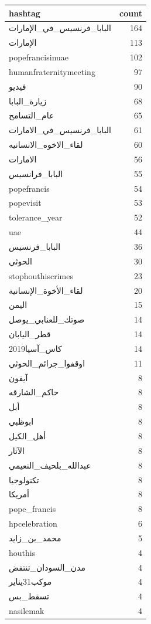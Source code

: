 \begin{tabular}{lr}
\toprule
hashtag & count \\
\midrule
البابا\_فرنسيس\_في\_الإمارات & 164 \\
الإمارات & 113 \\
popefrancisinuae & 102 \\
humanfraternitymeeting & 97 \\
فيديو & 90 \\
زيارة\_البابا & 68 \\
عام\_التسامح & 65 \\
البابا\_فرنسيس\_في\_الامارات & 61 \\
لقاء\_الاخوه\_الانسانيه & 60 \\
الامارات & 56 \\
البابا\_فرانسيس & 55 \\
popefrancis & 54 \\
popevisit & 53 \\
tolerance\_year & 52 \\
uae & 44 \\
البابا\_فرنسيس & 36 \\
الحوثي & 30 \\
stophouthiscrimes & 23 \\
لقاء\_الأخوة\_الإنسانية & 20 \\
اليمن & 15 \\
صوتك\_للعنابي\_يوصل & 14 \\
قطر\_اليابان & 14 \\
كاس\_آسيا2019 & 14 \\
اوقفوا\_جرائم\_الحوثي & 11 \\
آيفون & 8 \\
حاكم\_الشارقه & 8 \\
أبل & 8 \\
ابوظبي & 8 \\
أهل\_الكيل & 8 \\
الآثار & 8 \\
عبدالله\_بلحيف\_النعيمي & 8 \\
تكنولوجيا & 8 \\
أمريكا & 8 \\
pope\_francis & 8 \\
hpcelebration & 6 \\
محمد\_بن\_زايد & 5 \\
houthis & 4 \\
مدن\_السودان\_تنتفض & 4 \\
موكب31يناير & 4 \\
تسقط\_بس & 4 \\
nasilemak & 4 \\

\end{tabular}

